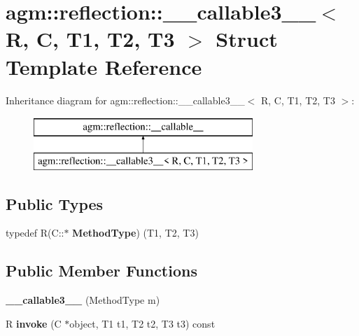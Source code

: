 \hypertarget{structagm_1_1reflection_1_1____callable3____}{}\section{agm\+:\+:reflection\+:\+:\+\_\+\+\_\+callable3\+\_\+\+\_\+$<$ R, C, T1, T2, T3 $>$ Struct Template Reference}
\label{structagm_1_1reflection_1_1____callable3____}
Inheritance diagram for agm\+:\+:reflection\+:\+:\+\_\+\+\_\+callable3\+\_\+\+\_\+$<$ R, C, T1, T2, T3 $>$\+:\begin{figure}[H]
\begin{center}
\leavevmode
\includegraphics[height=2.000000cm]{structagm_1_1reflection_1_1____callable3____}
\end{center}
\end{figure}
\subsection*{Public Types}
\begin{DoxyCompactItemize}
\item 
typedef R(C\+::$\ast$ {\bfseries Method\+Type}) (T1, T2, T3)\hypertarget{structagm_1_1reflection_1_1____callable3_____afa8b2f7e1b09536223d91f02e8c3652e}{}\label{structagm_1_1reflection_1_1____callable3_____afa8b2f7e1b09536223d91f02e8c3652e}

\end{DoxyCompactItemize}
\subsection*{Public Member Functions}
\begin{DoxyCompactItemize}
\item 
{\bfseries \+\_\+\+\_\+callable3\+\_\+\+\_\+} (Method\+Type m)\hypertarget{structagm_1_1reflection_1_1____callable3_____a5b472010519b305e55a974be6771885a}{}\label{structagm_1_1reflection_1_1____callable3_____a5b472010519b305e55a974be6771885a}

\item 
R {\bfseries invoke} (C $\ast$object, T1 t1, T2 t2, T3 t3) const \hypertarget{structagm_1_1reflection_1_1____callable3_____ab6545cd723fc6bb773653cc0fa643eef}{}\label{structagm_1_1reflection_1_1____callable3_____ab6545cd723fc6bb773653cc0fa643eef}

\end{DoxyCompactItemize}
